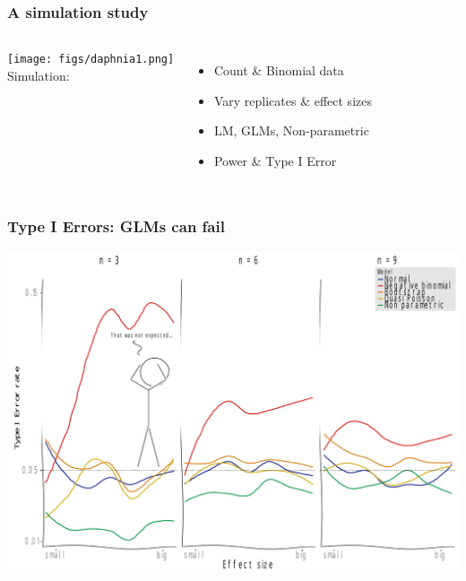 \documentclass[
	10pt
	]{beamer}
\begin{document}
\begin{frame}
\frametitle{A simulation study}
	\begin{columns}[T]
		\texttt{[image: figs/daphnia1.png]}\\
		\vspace{1em}
		Simulation: 
		\begin{itemize}
			\item Count \& Binomial data
			\item Vary replicates \& effect sizes
			\item LM, GLMs, Non-parametric
			\item Power \& Type I Error
		\end{itemize}
		\begin{adjustbox}{max totalsize={\textwidth}{\textheight}}
					
		\end{adjustbox}
	\end{columns}
\end{frame}



\begin{frame}
\frametitle{Type I Errors: GLMs can fail}
	\begin{center}
		\includegraphics[width=\textwidth]{figs/p_t1_xkcd.pdf}
	\end{center}
\end{frame}
\end{document}
